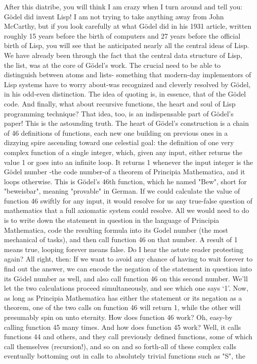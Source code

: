          After this diatribe, you will think I am crazy when I turn around and tell you:
Gödel did invent Lisp! I am not trying to take anything away from John McCarthy,
but if you look carefully at what Gödel did in his 1931 article, written roughly 15
years before the birth of computers and 27 years before the official birth of Lisp, you
will see that he anticipated nearly all the central ideas of Lisp. We have already been
through the fact that the central data structure of Lisp, the list, was at the core of
Gödel’s work. The crucial need to be able to distinguish between atoms and lists-
something that modern-day implementors of Lisp systems have to worry about-was
recognized and cleverly resolved by Gödel, in his odd-even distinction. The idea of
quoting is, in essence, that of the Gödel code. And finally, what about recursive
functions, the heart and soul of Lisp programming technique? That idea, too, is an
indispensable part of Gödel’s paper! This is the astounding truth.
         The heart of Gödel’s construction is a chain of 46 definitions of functions,
each new one building on previous ones in a dizzying spire ascending toward one
celestial goal: the definition of one very complex function of a single integer, which,
given any input, either returns the value 1 or goes into an infinite loop. It returns 1
whenever the input integer is the Gödel number -the code number-of a theorem of
Principia Mathematica, and it loops otherwise. This is Gödel’s 46th function, which
he named "Bew", short for "beweisbar", meaning "provable" in German.
         If we could calculate the value of function 46 swiftly for any input, it would
resolve for us any true-false question of mathematics that a full axiomatic system
could resolve. All we would need to do is to write down the statement in question in
the language of Principia Mathematica, code the resulting formula into its Godel
number (the most mechanical of tasks), and then call function 46 on that number. A
result of 1 means true, looping forever means false. Do I hear the astute reader
protesting again? All right, then: If we want to avoid any chance of having to wait
forever to find out the answer, we can encode the negation of the statement in
question into its Gödel number as well, and also call function 46 on this second
number. We'll let the two calculations proceed simultaneously, and see which one
says `1'. Now, as long as Principia Mathematica has either the statement or its
negation as a theorem, one of the two calls on function 46 will return 1, while the
other will presumably spin on unto eternity.
         How does function 46 work? Oh, easy-by calling function 45 many times. And
how does function 45 work? Well, it calls functions 44 and others, and they call
previously defined functions, some of which call themselves (recursion!), and so on
and so forth-all of these complex calls eventually bottoming out in calls to absolutely
trivial functions such as "S", the





